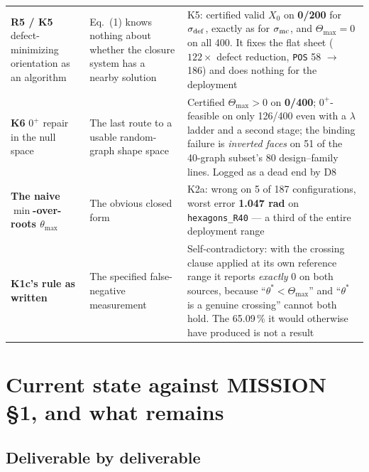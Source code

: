\documentclass[10pt,a4paper]{article}
\newcommand{\fn}[1]{\nolinkurl{#1}}
\begin{document}
\begin{table}[h]
\begin{tabular}{@{}p{42mm}p{55mm}p{55mm}@{}}
\textbf{R5 / K5} defect-minimizing orientation as an algorithm & Eq.~(1) knows nothing about whether the closure system has a nearby solution & K5: certified valid $X_0$ on \textbf{0/200} for $\sigma_{\rm def}$, exactly as for $\sigma_{\rm mc}$, and $\Theta_{\max}=0$ on all 400. It fixes the flat sheet ($122\times$ defect reduction, \texttt{POS} 58 $\to$ 186) and does nothing for the deployment \\
\textbf{K6} $0^+$ repair in the null space & The last route to a usable random-graph shape space & Certified $\Theta_{\max}>0$ on \textbf{0/400}; $0^+$-feasible on only 126/400 even with a $\lambda$ ladder and a second stage; the binding failure is \emph{inverted faces} on 51 of the 40-graph subset's 80 design--family lines. Logged as a dead end by D8 \\
\textbf{The naive $\min$-over-roots $\theta_{\max}$} & The obvious closed form & K2a: wrong on 5 of 187 configurations, worst error \textbf{1.047 rad} on \fn{hexagons_R40} --- a third of the entire deployment range \\
\textbf{K1c's rule as written} & The specified false-negative measurement & Self-contradictory: with the crossing clause applied at its own reference range it reports \emph{exactly} 0 on both sources, because ``$\theta^*<\Theta_{\max}$'' and ``$\theta^*$ is a genuine crossing'' cannot both hold. The 65.09\,\% it would otherwise have produced is not a result \\
\bottomrule
\end{tabular}
\end{table}

\section{Current state against MISSION \S1, and what remains}
\label{sec:current-state}

\subsection{Deliverable by deliverable}
\end{document}
